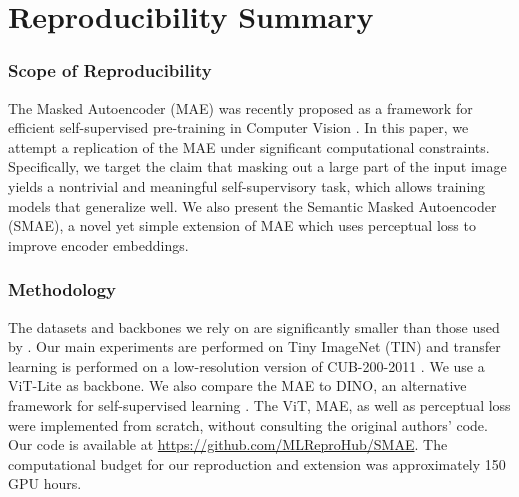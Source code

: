 \section*{\centering Reproducibility Summary}


\subsubsection*{Scope of Reproducibility}


The Masked Autoencoder (MAE) was recently proposed as a framework for efficient self-supervised pre-training in Computer Vision \cite{mae}. In this paper, we attempt a replication of the MAE under significant computational constraints. Specifically, we target the claim that masking out a large part of the input image yields a nontrivial and meaningful self-supervisory task, which allows training models that generalize well. We also present the Semantic Masked Autoencoder (SMAE), a novel yet simple extension of MAE which uses perceptual loss to improve encoder embeddings.

\subsubsection*{Methodology}


The datasets and backbones we rely on are significantly smaller than those used by \cite{mae}. Our main experiments are performed on Tiny ImageNet (TIN) \cite{tin} and transfer learning is performed on a low-resolution version of CUB-200-2011 \cite{cub}. We use a ViT-Lite \cite{hassani} as backbone. We also compare the MAE to DINO, an alternative framework for self-supervised learning \cite{dino}. The ViT, MAE, as well as perceptual loss were implemented from scratch, without consulting the original authors' code. Our code is available at \href{https://github.com/MLReproHub/SMAE}{https://github.com/MLReproHub/SMAE}. The computational budget for our reproduction and extension was approximately 150 GPU hours.

